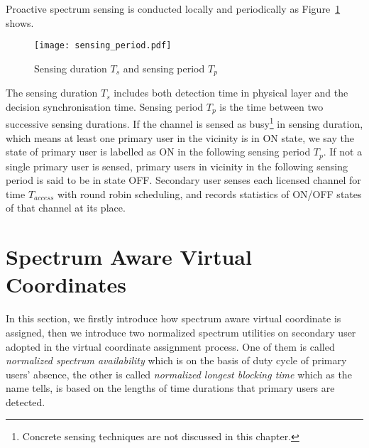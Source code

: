 
Proactive spectrum sensing is conducted locally and periodically as Figure~\ref{fig:sensing_period} shows. %
\begin{figure}[ht]
\centering
\texttt{[image: sensing\_period.pdf]}
\caption{Sensing duration $T_s$ and sensing period $T_p$}
\label{fig:sensing_period}
\end{figure}



The sensing duration $T_s$ includes both detection time in physical layer and the decision synchronisation time.
Sensing period $T_p$ is the time between two successive sensing durations.
If the channel is sensed as busy\footnote{Concrete sensing techniques are not discussed in this chapter.} in sensing duration, which means at least one primary user in the vicinity is in ON state, we say the state of primary user is labelled as ON in the following sensing period $T_p$.
If not a single primary user is sensed, primary users in vicinity in the following sensing period is said to be in state OFF.
Secondary user senses each licensed channel for time $T_{access}$ with round robin scheduling, and records statistics of ON/OFF states of that channel at its place.


\section{Spectrum Aware Virtual Coordinates}
In this section, we firstly introduce how spectrum aware virtual coordinate is assigned, then we introduce two normalized spectrum utilities on secondary user adopted in the virtual coordinate assignment process.
One of them is called \textit{normalized spectrum availability} which is on the basis of duty cycle of primary users' absence, the other is called \textit{normalized longest blocking time} which as the name tells, is based on the lengths of time durations that primary users are detected.

